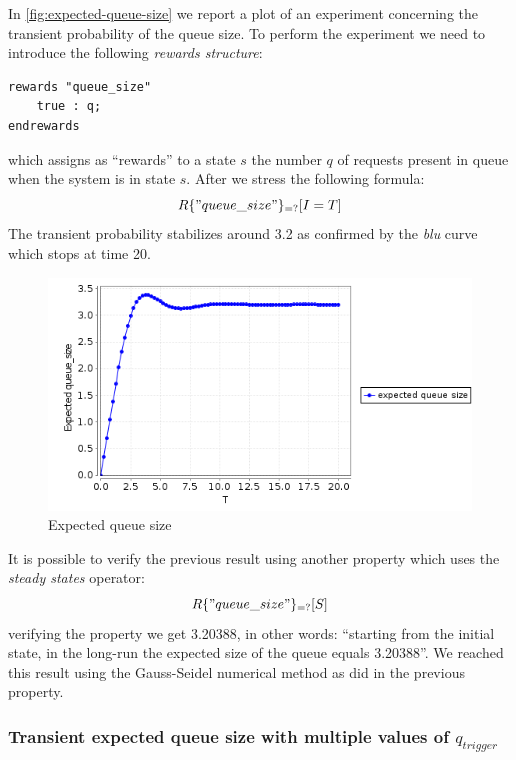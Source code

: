 In \autoref{fig:expected-queue-size} we report a plot of an experiment
concerning the transient probability of the queue size. To perform the
experiment we need to introduce the following \emph{rewards
  structure}:
\begin{verbatim}
rewards "queue_size"
	true : q;
endrewards
\end{verbatim}
which assigns as ``rewards'' to a state $s$ the number $q$ of requests
present in queue when the system is in state $s$. After we stress the
following formula:
\begin{displaymath}
  R\{"queue\_size"\}_{=?} [ I=T ]
\end{displaymath}
The transient probability stabilizes around 3.2 as confirmed by the
\emph{blu} curve which stops at time 20.
\begin{figure}[htb]
  \centering
  \includegraphics[width=13cm]{quantitative-project/expected-queue-size.png}
  \caption{Expected queue size}
  \label{fig:expected-queue-size}
\end{figure}
It is possible to verify the previous result using another property
which uses the \emph{steady states} operator:
\begin{displaymath}
  R\{"queue\_size"\}_{=?} [ S ]
\end{displaymath}
verifying the property we get 3.20388, in other words: ``starting from
the initial state, in the long-run the expected size of the queue
equals 3.20388''. We reached this result using the Gauss-Seidel
numerical method as did in the previous property.

\subsubsection{Transient expected queue size with multiple values of
  $q_{trigger}$}

